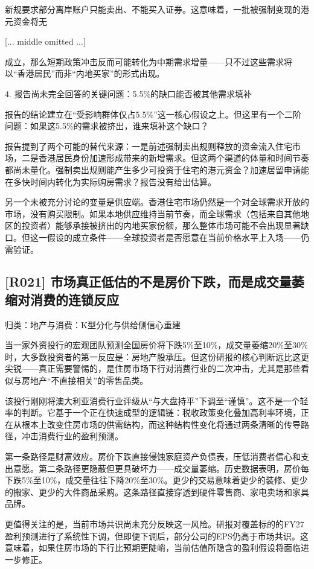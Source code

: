 \documentclass[11pt]{ctexart}
\begin{document}
新规要求部分离岸账户只能卖出、不能买入证券。这意味着，一批被强制变现的港元资金将无

[... middle omitted ...]

成立，那么短期政策冲击反而可能转化为中期需求增量——只不过这些需求将以“香港居民”而非“内地买家”的形式出现。

4. 报告尚未完全回答的关键问题：5.5\%的缺口能否被其他需求填补

报告的结论建立在“受影响群体仅占5.5\%”这一核心假设之上。但这里有一个二阶问题：如果这5.5\%的需求被挤出，谁来填补这个缺口？

报告提到了两个可能的替代来源：一是前述强制卖出规则释放的资金流入住宅市场，二是香港居民身份加速形成带来的新增需求。但这两个渠道的体量和时间节奏都尚未量化。强制卖出规则能产生多少可投资于住宅的港元资金？加速居留申请能在多快时间内转化为实际购房需求？报告没有给出估算。

另一个未被充分讨论的变量是供应端。香港住宅市场仍然是一个对全球需求开放的市场，没有购买限制。如果本地供应维持当前节奏，而全球需求（包括来自其他地区的投资者）能够承接被挤出的内地买家份额，那么整体市场可能不会出现显著缺口。但这一假设的成立条件——全球投资者是否愿意在当前价格水平上入场——仍需验证。

\subsection{[R021] 市场真正低估的不是房价下跌，而是成交量萎缩对消费的连锁反应}
{\small\color{refgray}归类：地产与消费：K型分化与供给侧信心重建}

当一家外资投行的宏观团队预测全国房价将下跌5\%至10\%，成交量萎缩20\%至30\%时，大多数投资者的第一反应是：房地产股承压。但这份研报的核心判断远比这更尖锐——真正需要警惕的，是住房市场下行对消费行业的二次冲击，尤其是那些看似与房地产“不直接相关”的零售品类。

该投行刚刚将澳大利亚消费行业评级从“与大盘持平”下调至“谨慎”。这不是一个轻率的判断。它基于一个正在快速成型的逻辑链：税收政策变化叠加高利率环境，正在从根本上改变住房市场的供需结构，而这种结构性变化将通过两条清晰的传导路径，冲击消费行业的盈利预测。

第一条路径是财富效应。房价下跌直接侵蚀家庭资产负债表，压低消费者信心和支出意愿。第二条路径更隐蔽但更具破坏力——成交量萎缩。历史数据表明，房价每下跌5\%至10\%，成交量往往下降20\%至30\%。更少的交易意味着更少的装修、更少的搬家、更少的大件商品采购。这条路径直接穿透到硬件零售商、家电卖场和家具品牌。

更值得关注的是，当前市场共识尚未充分反映这一风险。研报对覆盖标的的FY27盈利预测进行了系统性下调，但即便下调后，部分公司的EPS仍高于市场共识。这意味着，如果住房市场的下行比预期更陡峭，当前估值所隐含的盈利假设将面临进一步修正。
\end{document}
